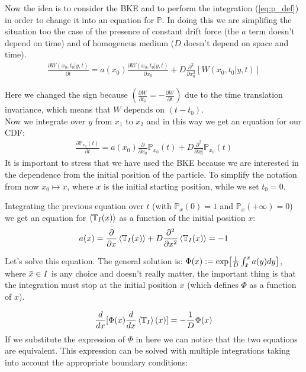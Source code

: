 \documentclass[\main/main.tex]{subfiles}
\begin{document}
Now the idea is to consider the BKE and to perform the integration (\ref{eq:p_def}) in order to change it into an equation for $\mathbb{P}$. In doing this we are simplifing the situation too the case of the presence of constant drift force (the $a$ term doesn't depend on time) and of homogeneus medium ($D$ doesn't depend on space and time).
\begin{eqnarray}
\frac{\partial W(x_0,t_0|y,t)}{\partial t}= a(x_0)\frac{\partial W(x_0,t_0|y,t)}{\partial x_0}+D\frac{\partial
^2}{\partial x_0 ^2 }[W(x_0,t_0|y,t)]
\end{eqnarray}

Here we changed the sign because $(\frac{\partial W}{\partial t_0}= - \frac{\partial W}{\partial t})$ due to the time translation invariance, which means that $W$ depends on $(t-t_0)$. \\

Now we integrate over $y$ from $x_1$ to $x_2$ and in this way we get an equation for our CDF:
\begin{eqnarray}
\frac{\partial\mathbb{P}_{x_0}(t)}{\partial t} = a(x_0)\frac{\partial}{\partial x_0} \mathbb{P}_{x_0}(t) + D \frac{\partial ^2}{\partial x_0 ^2}\mathbb{P}_{x_0}(t)
\end{eqnarray}
It is important to stress that we have used the BKE because we are interested in the dependence from the initial position of the particle.
To simplify the notation from now $x_0 \mapsto x$, where $x$ is the initial starting position, while we set $t_0=0$.

Integrating the previous equation over $t$ (with $\mathbb{P}_x(0)=1$ and $\mathbb{P}_x(+\infty)=0$) we get an equation for $\left\langle \mathbb{T}_I (x) \right\rangle$ as a function of the initial position $x$:
\begin{eqnarray}
a(x)=\frac{\partial}{\partial x} \left\langle \mathbb{T}_I(x) \right\rangle+D\frac{\partial^2}{\partial x ^2}\left\langle \mathbb{T}_I (x) \right\rangle=-1
\end{eqnarray}

Let's solve this equation. The general solution is: $\Phi(x):=\exp[\frac{1}{D}\int_{\Bar{x}} ^x a(y)dy]$, where $\Bar{x}\in I$ is any choice and doesn't really matter, the important thing is that the integration must stop at the initial position $x$ (which defines $\Phi$ as a function of $x$). 

\begin{eqnarray}
    \frac{d}{dx}[\Phi(x)\frac{d}{dx}\left\langle \mathbb{T}_I \right\rangle(x)]=-\frac{1}{D}\Phi(x)
\end{eqnarray}
If we substitute the expression of $\Phi$ in here we can notice that the two equations are equivalent. This expression can be solved with multiple integrations taking into account the appropriate boundary conditions:
\end{document}
